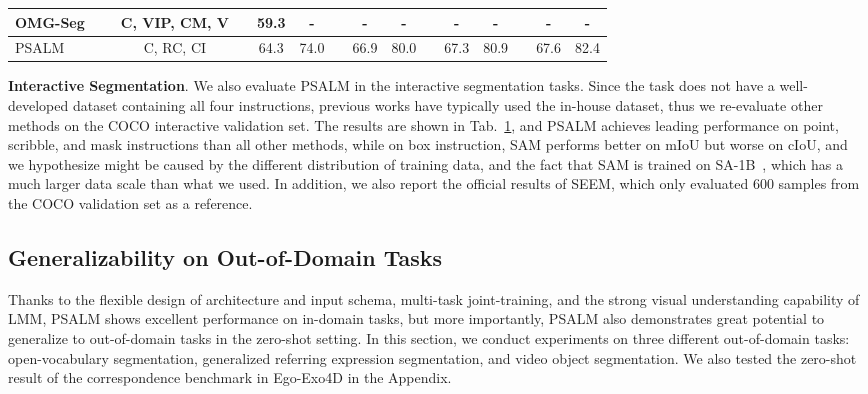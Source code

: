 \begin{table}[h!]
{\begin{tabular}{llclccccccccccc}
OMG-Seg~\cite{omgseg}                            &  & C, VIP, CM, V                    &  & 59.3                         & -                         &  & -                            & -                         &  & -                            & -                         &  & -                            & -                         \\ \midrule
PSALM                              &  & C, RC, CI                        &  & 64.3                         & 74.0                      &  & 66.9                         & 80.0                      &  & 67.3                         & 80.9                      &  & 67.6                         & 82.4                      \\ \bottomrule
\end{tabular}
}
\label{tab:inter_coco}
\end{table}

\noindent\textbf{Interactive Segmentation}. 
We also evaluate PSALM in the interactive segmentation tasks. Since the task does not have a well-developed dataset containing all four instructions, previous works have typically used the in-house dataset, thus we re-evaluate other methods on the COCO interactive validation set. The results are shown in Tab.~\ref{tab:inter_coco}, and PSALM achieves leading performance on point, scribble, and mask instructions than all other methods, while on box instruction, SAM performs better on mIoU but worse on cIoU, and we hypothesize might be caused by the different distribution of training data, and the fact that SAM is trained on SA-1B~\cite{sam}, which has a much larger data scale than what we used. 
In addition, we also report the official results of SEEM, which only evaluated 600 samples from the COCO validation set as a reference. 

\subsection{Generalizability on Out-of-Domain Tasks }
Thanks to the flexible design of architecture and input schema, multi-task joint-training, and the strong visual understanding capability of LMM, PSALM shows excellent performance on in-domain tasks, but more importantly, PSALM also demonstrates great potential to generalize to out-of-domain tasks in the zero-shot setting. In this section, we conduct experiments on three different out-of-domain tasks: open-vocabulary segmentation, generalized referring expression segmentation, and video object segmentation. We also tested the zero-shot result of the correspondence benchmark in Ego-Exo4D\cite{egoexo} in the Appendix.

